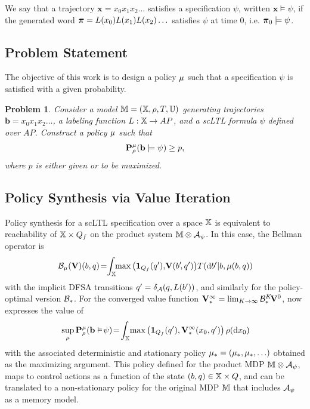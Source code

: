 \documentclass[conference]{IEEEtran}
\newtheorem{problem}{Problem}
\newcommand{\red}[1]{{\color{red} #1 }}
\begin{document}
We say that a trajectory $\mathbf{x} = x_0 x_1 x_2 \ldots$ satisfies a specification $\psi$, written $\mathbf{x} \models \psi$, if the generated word $\boldsymbol{\pi} =L(x_0) L(x_1) L(x_2) \ldots$ satisfies $\psi$ at time 0, i.e. $\boldsymbol{\pi}_0 \models \psi$.

\subsection{Problem Statement}

The objective of this work is to design a policy $\mu$ such that a specification $\psi$ is satisfied with a given probability.
\begin{problem}
\label{prob:main}
  Consider a model $\mathbb{M} = (\mathbb{X}, \rho, T, \mathbb{U})$ generating trajectories $\mathbf{b} = x_0 x_1 x_2 \ldots$, a labeling function $L : \mathbb{X} \rightarrow AP$, and a scLTL formula $\psi$ defined over $AP$. Construct a policy $\mu$ such that
  \begin{equation}\label{eq:probstatement}
    \Prob_\init^\pol ( \mathbf{b} \models \psi )\geq p,
  \end{equation}
  where $p$ is either given or to be maximized.
\end{problem}

\subsection{Policy Synthesis via Value Iteration}

Policy synthesis for a scLTL specification over a space $\mathbb{X}$ is equivalent to reachability of $\mathbb{X}\times Q_f$ on the product system $\mathbb{M} \otimes \mathcal{A}_\psi$. In this case, the Bellman operator is
\begin{equation}
\label{eq:V_recopt_inf_mu}
  \bellman_\pol (\mathbf V)(b,q)\! = \hspace{-1mm} \int_{\X} \hspace{-1mm} \max \left( \mathbf 1_{Q_f}(q'), \!\mathbf V( b'\!, q') \right)\! {\tr}(\mathrm{d} b' |b,\pol(b,q))\!
\end{equation}
with the implicit DFSA transitions  $q' =\delta_{\mathcal{A}}(q,L(b'))$, %
and similarly for the policy-optimal version $\mathcal{B}_*$.  For the converged value function $\mathbf V^\infty_* =  \lim_{K\rightarrow\infty}\mathcal{B}_*^K\! \mathbf V^0$, now expresses the value of
\begin{equation}
\label{eq:prob:_optimal} 
 \sup_{\pol}\mathbf{P}_\init^{\pol}( {\mathbf{b}} \vDash\! \psi)\! =\!
  \int_{\X} \! \max \left( \mathbf 1_{Q_f}( q'), 
   \mathbf V^\infty_*(x_0, q') \right) \init(\mathrm{d} x_0) \!
\end{equation}
with the associated deterministic and stationary policy $ \mu_*=(\mu_*,\mu_*,\ldots)$ obtained as the maximizing argument. 
This policy defined for the product MDP $\mathbb{M} \otimes \mathcal{A}_\psi$, maps to control actions as a function of the state $(b,q) \in \mathbb{X} \times Q$, and can be translated to a non-stationary policy for the original MDP $\mathbb{M}$ that includes $\mathcal{A}_\psi$ as a memory model.
\end{document}
